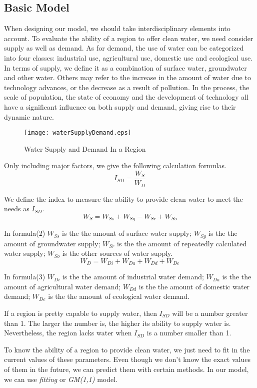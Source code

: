 \documentclass{mcmthesis}
\begin{document}
\subsection{Basic Model}
\par When designing our model, we should take interdisciplinary elements into account. To evaluate the ability of a region to offer clean water, we need consider supply as well as demand. As for demand, the use of water can be categorized into four classes: industrial use, agricultural use, domestic use and ecological use. In terms of supply, we define it as a combination of surface water, groundwater and other water. Others may refer to the increase in the amount of water due to technology advances, or the decrease as a result of pollution. In the process, the scale of population, the state of economy and the development of technology all have a significant influence on both supply and demand, giving rise to their dynamic nature.

\begin{figure}[h]
\small
\centering
\texttt{[image: waterSupplyDemand.eps]}
\caption{Water Supply and Demand In a Region} \label{fig:Water Supply and Demand In a Region}
\end{figure}

\par Only including major factors, we give the following calculation formulas.
\begin{equation}
	I_{SD} = \frac{W_S}{W_D}
\end{equation}
\par We define the index to measure the ability to provide clean water to meet the needs as $I_{SD}$. 
\begin{equation}
	W_S = W_{Ss} + W_{Sg} - W_{Sr} + W_{So}
\end{equation}
\par In formula(2) $W_{Ss}$ is the the amount of surface water supply; $W_{Sg}$ is the the amount of groundwater supply; $W_{Sr}$ is the the amount of repeatedly calculated water supply; $W_{So}$ is the other sources of water supply.
\begin{equation}
	W_D = W_{Di} + W_{Da} + W_{Dd} + W_{De}
\end{equation}
\par In formula(3) $W_{Di}$ is the the amount of industrial water demand; $W_{Da}$ is the the amount of agricultural water demand; $W_{Dd}$ is the the amount of domestic water demand; $W_{De}$ is the the amount of ecological water demand.
\par If a region is pretty capable to supply water, then $I_{SD}$ will be a number greater than 1. The larger the number is, the higher its ability to supply water is. Nevertheless, the region lacks water when $I_{SD}$ is a number smaller than 1. 
\par To know the ability of a region to provide clean water, we just need to fit in the current values of these parameters. Even though we don’t know the exact values of them in the future, we can predict them with certain methods. In our model, we can use \emph{fitting} or \emph{GM(1,1)} model.
\end{document}
